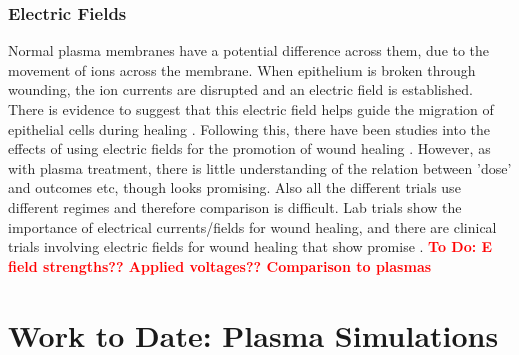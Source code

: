 \documentclass[11pt, oneside]{article}   	%
\newcommand{\todo}[1]{ \textcolor{red}{\bf{To Do:} #1}}
\begin{document}
%
%


\subsubsection{Electric Fields}

Normal plasma membranes have a potential difference across them, due to the movement of ions across the membrane.
When epithelium is broken through wounding, the ion currents are disrupted and an electric field is established.
There is evidence to suggest that this electric field helps guide the migration of epithelial cells during healing \cite{Zhao2009electrical}.
Following this, there have been studies into the effects of using electric fields for the promotion of wound healing \cite{Thakral2013electrical, Messerli2011extracellular}.
However, as with plasma treatment, there is little understanding of the relation between 'dose' and outcomes etc, though looks promising.
Also all the different trials use different regimes and therefore comparison is difficult.
Lab trials show the importance of electrical currents/fields for wound healing, and there are clinical trials involving electric fields for wound healing that show promise \cite{Messerli2011extracellular}.
\todo{E field strengths?? Applied voltages?? Comparison to plasmas}

\section{Work to Date: Plasma Simulations}
\end{document}
